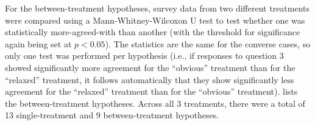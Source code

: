 For the between-treatment hypotheses, survey data from two different treatments were compared using a Mann-Whitney-Wilcoxon U test to test whether one was statistically more-agreed-with than another (with the threshold for significance again being set at $p < 0.05$).
%
The statistics are the same for the converse cases, so only one test was performed per hypothesis (i.e., if responses to question 3 showed significantly more agreement for the ``obvious'' treatment than for the ``relaxed'' treatment, it follows automatically that they show significantly less agreement for the ``relaxed'' treatment than for the ``obvious'' treatment).
%
 lists the between-treatment hypotheses.
%
Across all 3 treatments, there were a total of 13 single-treatment and 9 between-treatment hypotheses.



